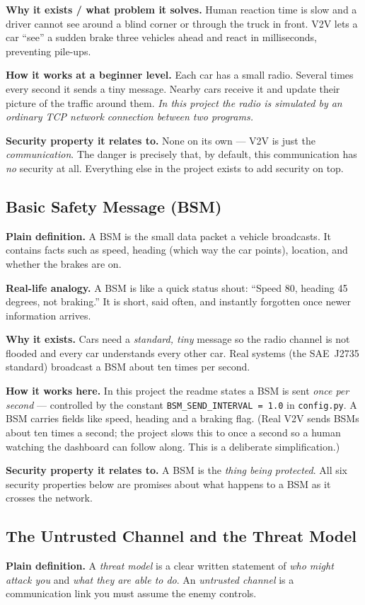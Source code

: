 \documentclass[11pt,a4paper]{report}
\begin{document}
\textbf{Why it exists / what problem it solves.} Human reaction time is slow and
a driver cannot see around a blind corner or through the truck in front. V2V
lets a car ``see'' a sudden brake three vehicles ahead and react in
milliseconds, preventing pile-ups.

\textbf{How it works at a beginner level.} Each car has a small radio. Several
times every second it sends a tiny message. Nearby cars receive it and update
their picture of the traffic around them. \emph{In this project the radio is
simulated by an ordinary TCP network connection between two programs.}

\textbf{Security property it relates to.} None on its own --- V2V is just the
\emph{communication}. The danger is precisely that, by default, this
communication has \emph{no} security at all. Everything else in the project
exists to add security on top.

\subsection{Basic Safety Message (BSM)}
\textbf{Plain definition.} A BSM is the small data packet a vehicle broadcasts.
It contains facts such as speed, heading (which way the car points), location,
and whether the brakes are on.

\textbf{Real-life analogy.} A BSM is like a quick status shout: ``Speed 80,
heading 45 degrees, not braking.'' It is short, said often, and instantly
forgotten once newer information arrives.

\textbf{Why it exists.} Cars need a \emph{standard, tiny} message so the radio
channel is not flooded and every car understands every other car. Real systems
(the SAE~J2735 standard) broadcast a BSM about ten times per second.

\textbf{How it works here.} In this project the readme states a BSM is sent
\emph{once per second} --- controlled by the constant
\texttt{BSM\_SEND\_INTERVAL = 1.0} in \texttt{config.py}. A BSM carries fields
like speed, heading and a braking flag. (Real V2V sends BSMs about ten times a
second; the project slows this to once a second so a human watching the
dashboard can follow along. This is a deliberate simplification.)

\textbf{Security property it relates to.} A BSM is the \emph{thing being
protected}. All six security properties below are promises about what happens
to a BSM as it crosses the network.

\subsection{The Untrusted Channel and the Threat Model}
\textbf{Plain definition.} A \emph{threat model} is a clear written statement of
\emph{who might attack you} and \emph{what they are able to do}. An
\emph{untrusted channel} is a communication link you must assume the enemy
controls.
\end{document}
